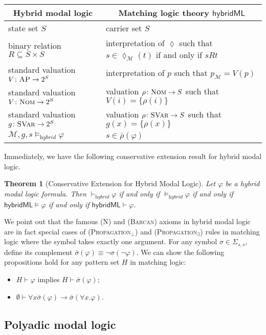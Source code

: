 \documentclass[letter,12pt]{article}
\newtheorem{theorem}{Theorem}
\newcommand{\imp}{\to}
\newcommand{\SVar}{\textnormal{\textsc{SVar}}}
\newcommand{\Nom}{\textnormal{\textsc{Nom}}}
\newcommand{\MM}{\mathcal{M}}
\newcommand{\pset}[1]{2^{#1}}
\newcommand{\barrho}{\bar{\rho}}
\newcommand{\MLhybridML}{\mathsf{hybridML}}
\newcommand{\hybridModalLogic}{\textit{hybrid}}
\newcommand{\prule}[1]{\textsc{(#1)}}
\newcommand{\propagationbottom}{\prule{Propagation$_\bot$}\xspace}
\newcommand{\propagationexists}{\prule{Propagation$_\exists$}\xspace}
\newcommand{\sigmabar}{\bar{\sigma}}
\newcommand{\AP}{\textsc{AP}}
\newcommand{\eventually}{{\lozenge}}
\begin{document}
\begin{center}
\begin{tabular}{ll}
\multicolumn{1}{c}{Hybrid modal logic} & 
\multicolumn{1}{c}{Matching logic theory $\MLhybridML$}
\\\hline
state set $S$ & carrier set $S$
\\
binary relation $R \subseteq S \times S$ & interpretation of $\eventually$ such that
                      $s \in \eventually_\MM (t)$ if and only if $s R t$
\\
standard valuation $V \colon \AP \to \pset{S}$
& interpretation of $p$ such that $p_\MM = V(p)$
\\
standard valuation $V \colon \Nom \to \pset{S}$
& valuation $\rho \colon \Nom \to S$ such that
$V(i) = \{ \rho(i) \}$
\\
standard valuation $g \colon \SVar \to \pset{S}$
& valuation $\rho \colon \SVar \to S$ such that
$g(x) = \{ \rho(x) \}$
\\
$\MM,g,s \vDash_\hybridModalLogic \varphi$
& $s \in \barrho(\varphi)$
\end{tabular}
\end{center}
Immediately, we have the following conservative extension result for hybrid modal logic.
\begin{theorem}[Conservative Extension for Hybrid Modal Logic]
Let $\varphi$ be a hybrid modal logic formula.
Then
$\vdash_\hybridModalLogic \varphi$ if and only if
$\vDash_\hybridModalLogic \varphi$ if and only if 
$\MLhybridML \vDash \varphi$ if and only if
$\MLhybridML \vdash \varphi$.
\end{theorem}

We point out that the famous \prule{N} and \prule{Barcan} axioms
in hybrid modal logic
are in fact special cases
of \propagationbottom and \propagationexists rules
in matching logic where the symbol takes exactly one argument.
For any symbol $\sigma \in \Sigma_{s,s}$,
define its complement $\sigmabar (\varphi) \equiv \neg \sigma(\neg \varphi)$.
We can show the following propositions hold for
any pattern set $H$ in matching logic:
\begin{itemize}
\item $H \vdash \varphi$ implies $H \vdash \sigmabar(\varphi)$;
\item $\emptyset \vdash \forall x  \sigmabar(\varphi) \imp \sigmabar(\forall x . \varphi)$.
\end{itemize}

\subsection{Polyadic modal logic}
\end{document}
